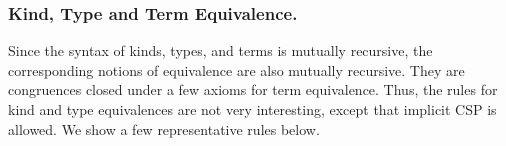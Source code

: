 \subsubsection{Kind, Type and Term Equivalence.}

Since the syntax of kinds, types, and terms is mutually recursive,
the corresponding notions of equivalence are also mutually recursive.
They are congruences closed under a few axioms for term equivalence.
Thus, the rules for kind and type equivalences are not very interesting, 
except that implicit CSP is allowed.
We show a few representative rules below.

  {\small
    \begin{center}
      \hfil
      \\[2mm]
    \end{center}
  }



